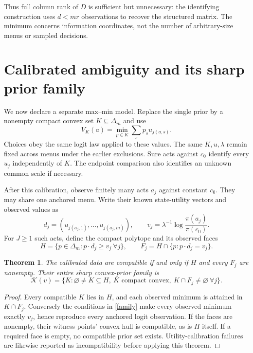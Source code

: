 \documentclass[11pt]{article}
\newtheorem{theorem}{Theorem}
\begin{document}
Thus full column rank of $D$ is sufficient but unnecessary: the identifying construction uses $d<mr$ observations to recover the structured matrix. The minimum concerns information coordinates, not the number of arbitrary-size menus or sampled decisions.

\section{Calibrated ambiguity and its sharp prior family}
We now declare a separate max--min model. Replace the single prior by a nonempty compact convex set $K\subseteq\Delta_m$ and use
\[
 V_K(a)=\min_{p\in K}\sum_s p_su_{j(a,s)}.
\]
Choices obey the same logit law applied to these values. The same $K,u,\lambda$ remain fixed across menus under the earlier exclusions. Sure acts against $c_0$ identify every $u_j$ independently of $K$. The endpoint comparison also identifies an unknown common scale if necessary.

After this calibration, observe finitely many acts $a_j$ against constant $c_0$. They may share one anchored menu. Write their known state-utility vectors and observed values as
\[
 d_j=(u_{j(a_j,1)},\ldots,u_{j(a_j,m)}),\qquad
 v_j=\lambda^{-1}\log\frac{\pi(a_j)}{\pi(c_0)}.
\]
For $J\ge1$ such acts, define the compact polytope and its observed faces
\begin{equation}\label{faces}
 H=\{p\in\Delta_m:p\cdot d_j\ge v_j\ \forall j\},\qquad
 F_j=H\cap\{p:p\cdot d_j=v_j\}.
\end{equation}

\begin{theorem}\label{priorfamily}
The calibrated data are compatible if and only if $H$ and every $F_j$ are nonempty. Their entire sharp convex-prior family is
\begin{equation}\label{family}
 \mathcal K(v)=\{K:\varnothing\ne K\subseteq H,\ K\text{ compact convex},
                         \ K\cap F_j\ne\varnothing\ \forall j\}.
\end{equation}
\end{theorem}
\begin{proof}
Every compatible $K$ lies in $H$, and each observed minimum is attained in $K\cap F_j$. Conversely the conditions in \eqref{family} make every observed minimum exactly $v_j$, hence reproduce every anchored logit observation. If the faces are nonempty, their witness points' convex hull is compatible, as is $H$ itself. If a required face is empty, no compatible prior set exists. Utility-calibration failures are likewise reported as incompatibility before applying this theorem.
\end{proof}
\end{document}
